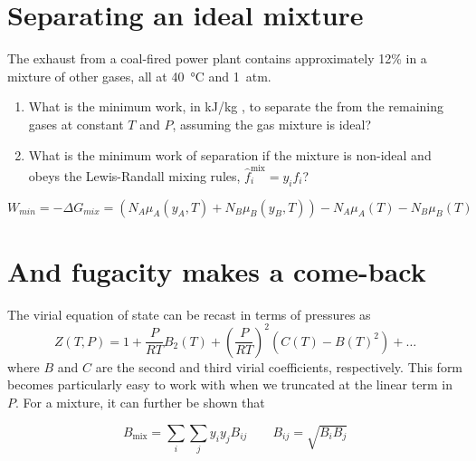 \documentclass[11pt]{article}
\begin{document}
\section{Separating an ideal mixture}
\label{sec:org0b11147}
The exhaust from a coal-fired power plant contains approximately 12\%  in a
  mixture of other gases, all at \SI{40}{\celsius} and \SI{1}{atm}.

\begin{enumerate}
\item What is the minimum work, in kJ/kg , to separate the  from the
remaining gases at constant \(T\) and \(P\), assuming the gas mixture is ideal?

\item What is the minimum work of separation if the mixture is non-ideal and obeys the
Lewis-Randall mixing rules, \(\hat{f}_i^{\text{mix}} = y_i f_i\)?
\end{enumerate}

\[
W_{min} = -\Delta G_{mix} = (N_A \mu_A(y_A,T) + N_B \mu_B(y_B,T)) - N_A \mu_A(T) - N_B \mu_B(T)
\]

\section{And fugacity makes a come-back}
\label{sec:orgcfce4c0}
The virial equation of state can be recast in terms of pressures as
\begin{equation*}
Z(T,P) = 1 + \frac{P}{RT} B_2(T) + \left (\frac{P}{RT} \right )^2 \left ( C(T)-B(T)^2 \right ) + \ldots
\end{equation*}
where \(B\) and \(C\) are the second and third virial coefficients, respectively.  This form becomes particularly easy to work with when  we truncated at the linear term in \(P\).  For a mixture, it can further be shown that

\begin{equation*}
  B_\text{mix} =  \sum_i\sum_j y_iy_j B_{ij} \qquad B_{ij} = \sqrt{B_iB_j}
\end{equation*}
\end{document}
